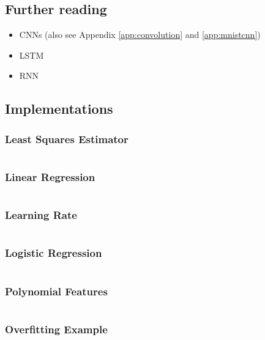 \documentclass[a4paper,twoside,10pt]{article}
\begin{document}
\subsection{Further reading}
\begin{itemize}
  \item \acp{CNN} (also see Appendix \ref{app:convolution} and \ref{app:mnistcnn})
  \item \ac{LSTM}
  \item \ac{RNN}
\end{itemize}

\subsection{Implementations}
\subsubsection{Least Squares Estimator}\label{app:lse}
\inputminted[frame=lines,linenos,fontsize=\small]{python}{least_squares.py}

\subsubsection{Linear Regression}\label{app:gradientdescent}
\inputminted[frame=lines,linenos,fontsize=\small]{python}{gradient_descent.py}

\subsubsection{Learning Rate}\label{app:alphas}
\inputminted[frame=lines,linenos,fontsize=\small]{python}{learning_rate.py}

\subsubsection{Logistic Regression}\label{app:classifier}
\inputminted[frame=lines,linenos,fontsize=\small]{python}{classifier.py}

\subsubsection{Polynomial Features}\label{app:polynomial}
\inputminted[frame=lines,linenos,fontsize=\small]{python}{polynomial.py}

\subsubsection{Overfitting Example}\label{app:overfitting}
\inputminted[frame=lines,linenos,fontsize=\small]{python}{overfitting.py}
\end{document}
